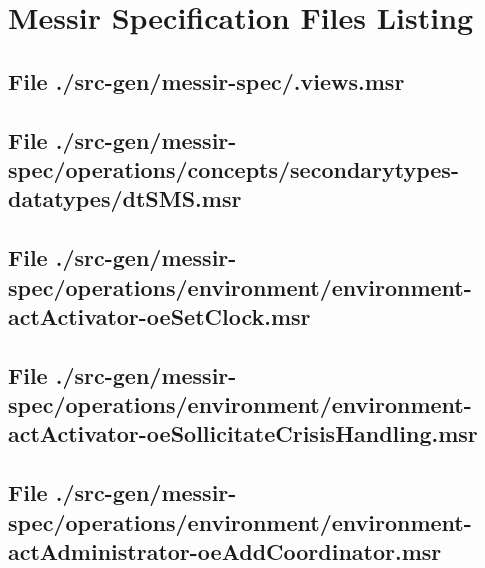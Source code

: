 \chapter{Messir Specification Files Listing}

\section[File /src-gen/messir-spec/.views.msr]{File ./src-gen/messir-spec/.views.msr}
\scriptsize

\normalsize
	
\section[File /src-gen/messir-spec/operations/concepts/secondarytypes-datatypes/dtSMS.msr]{File ./src-gen/messir-spec/operations/concepts/secondarytypes-datatypes/dtSMS.msr}
\scriptsize

\normalsize
	
\section[File /src-gen/messir-spec/operations.../environment-actActivator-oeSetClock.msr]{File ./src-gen/messir-spec/operations/environment/environment-actActivator-oeSetClock.msr}
\scriptsize

\normalsize
	
\section[File /src-gen.../environment-actActivator-oeSollicitateCrisisHandling.msr]{File ./src-gen/messir-spec/operations/environment/environment-actActivator-oeSollicitateCrisisHandling.msr}
\scriptsize

\normalsize
	
\section[File /src-gen/messir-spec.../environment-actAdministrator-oeAddCoordinator.msr]{File ./src-gen/messir-spec/operations/environment/environment-actAdministrator-oeAddCoordinator.msr}
\scriptsize

\normalsize
	
